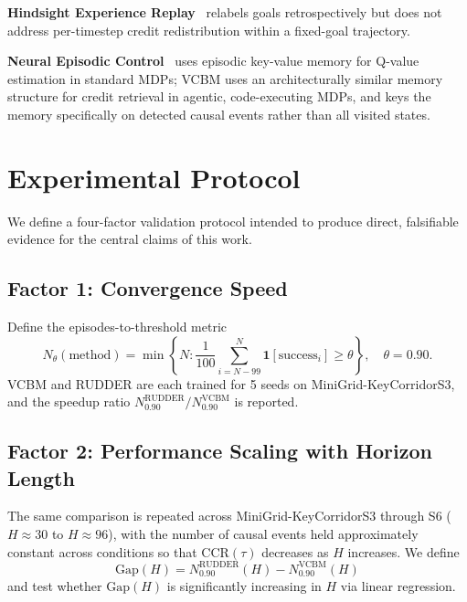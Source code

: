 \documentclass[11pt]{article}
\begin{document}
\textbf{Hindsight Experience Replay}~\cite{her2017} relabels goals
retrospectively but does not address per-timestep credit redistribution
within a fixed-goal trajectory.

\textbf{Neural Episodic Control}~\cite{nec2017} uses episodic key-value memory
for Q-value estimation in standard MDPs; VCBM uses an architecturally similar
memory structure for credit retrieval in agentic, code-executing MDPs, and
keys the memory specifically on detected causal events rather than all visited
states.

\section{Experimental Protocol}

We define a four-factor validation protocol intended to produce direct,
falsifiable evidence for the central claims of this work.

\subsection{Factor 1: Convergence Speed}

Define the episodes-to-threshold metric
\begin{equation}
N_\theta(\mathrm{method}) = \min\left\{N : \frac{1}{100}\sum_{i=N-99}^{N} \mathbf{1}[\mathrm{success}_i] \geq \theta\right\}, \quad \theta = 0.90.
\end{equation}
VCBM and RUDDER are each trained for 5 seeds on MiniGrid-KeyCorridorS3, and the
speedup ratio $N_{0.90}^{\mathrm{RUDDER}} / N_{0.90}^{\mathrm{VCBM}}$ is reported.

\subsection{Factor 2: Performance Scaling with Horizon Length}

The same comparison is repeated across MiniGrid-KeyCorridorS3 through S6
($H \approx 30$ to $H \approx 96$), with the number of causal events held
approximately constant across conditions so that $\mathrm{CCR}(\tau)$ decreases
as $H$ increases. We define
\begin{equation}
\mathrm{Gap}(H) = N_{0.90}^{\mathrm{RUDDER}}(H) - N_{0.90}^{\mathrm{VCBM}}(H)
\end{equation}
and test whether $\mathrm{Gap}(H)$ is significantly increasing in $H$ via
linear regression.
\end{document}
